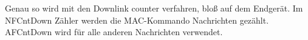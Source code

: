 \documentclass[a4paper,12pt]{article}
\begin{document}
            Genau so wird mit den Downlink counter verfahren, bloß auf dem Endgerät. Im NFCntDown Zähler werden die 
            MAC-Kommando Nachrichten gezählt. AFCntDown wird für alle anderen Nachrichten verwendet.\cite[S.22 ff]{LoRaSec}

    \newpage
    
    
\end{document}
